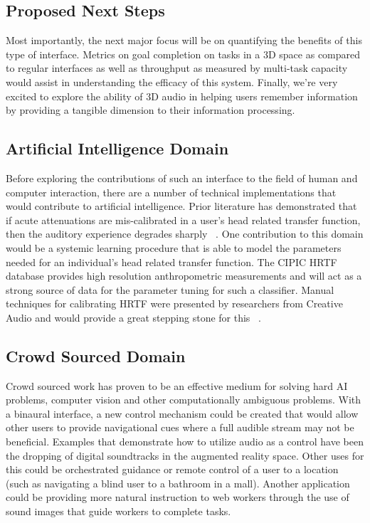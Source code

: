 \subsection{                  Proposed Next Steps                             }

Most importantly, the next major focus will be on quantifying the benefits of
this type of interface. Metrics on goal completion on tasks in a 3D space as
compared to regular interfaces as well as throughput as measured by multi-task
capacity would assist in understanding the efficacy of this system. Finally,
we’re very excited to explore the ability of 3D audio in helping users remember
information by providing a tangible dimension to their information processing.

\subsection{                  Artificial Intelligence Domain                  }

Before exploring the contributions of such an interface to the field of human
and computer interaction, there are a number of technical implementations that
would contribute to artificial intelligence.  Prior literature has
demonstrated that if acute attenuations are mis-calibrated in a user's head
related transfer function, then the auditory experience degrades sharply
~\cite{algazi2001cipic}.  One contribution to this domain would be a systemic
learning procedure that is able to model the parameters needed for an
individual's head related transfer function.  The CIPIC HRTF database provides
high resolution anthropometric measurements and will act as a strong source of
data for the parameter tuning for such a classifier.  Manual techniques for
calibrating HRTF were presented by researchers from Creative Audio and would
provide a great stepping stone for this ~\cite{jost2000transaural}.


\subsection{                  Crowd Sourced Domain                               }

Crowd sourced work has proven to be an effective medium for solving hard AI
problems, computer vision and other computationally ambiguous problems.  With a
binaural interface, a new control mechanism could be created that would allow
other users to provide navigational cues where a full audible stream may not
be beneficial.  Examples that demonstrate how to utilize audio as a control have
been the dropping of digital soundtracks in the augmented reality space.  Other
uses for this could be orchestrated guidance or remote control of a user to a
location (such as navigating a blind user to a bathroom in a mall).  Another
application could be providing more natural instruction to web workers through
the use of sound images that guide workers to complete tasks.
